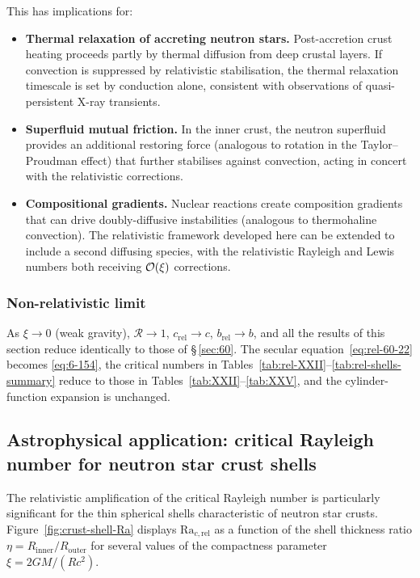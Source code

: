 This has implications for:
\begin{itemize}
\item \textbf{Thermal relaxation of accreting neutron stars.}
  Post-accretion crust heating proceeds partly by thermal diffusion
  from deep crustal layers.  If convection is suppressed by
  relativistic stabilisation, the thermal relaxation timescale is
  set by conduction alone, consistent with observations of
  quasi-persistent X-ray transients.

\item \textbf{Superfluid mutual friction.}  In the inner crust, the
  neutron superfluid provides an additional restoring force
  (analogous to rotation in the Taylor--Proudman effect) that
  further stabilises against convection, acting in concert with the
  relativistic corrections.

\item \textbf{Compositional gradients.}  Nuclear reactions create
  composition gradients that can drive doubly-diffusive instabilities
  (analogous to thermohaline convection).  The relativistic
  framework developed here can be extended to include a second
  diffusing species, with the relativistic Rayleigh and Lewis numbers
  both receiving $\mathcal{O}(\xi)$ corrections.
\end{itemize}

\subsubsection{Non-relativistic limit}

\noindent As $\xi\to 0$ (weak gravity), $\mathscr{R}\to 1$,
$c_{\mathrm{rel}}\to c$, $b_{\mathrm{rel}}\to b$, and all the
results of this section reduce identically to those of
\S\,\ref{sec:60}.  The secular equation~\eqref{eq:rel-60-22} becomes
\eqref{eq:6-154}, the critical numbers in
Tables~\ref{tab:rel-XXII}--\ref{tab:rel-shells-summary} reduce to
those in Tables~\ref{tab:XXII}--\ref{tab:XXV}, and the
cylinder-function expansion is unchanged.

\subsection{Astrophysical application: critical Rayleigh number
for neutron star crust shells}
\label{sec:rel-60-crust-plot}

The relativistic amplification of the critical Rayleigh number
is particularly significant for the thin spherical shells
characteristic of neutron star crusts.
Figure~\ref{fig:crust-shell-Ra} displays $\mathrm{Ra}_{c,\mathrm{rel}}$
as a function of the shell thickness ratio
$\eta = R_{\mathrm{inner}}/R_{\mathrm{outer}}$ for several values
of the compactness parameter $\xi = 2GM/(Rc^{2})$.


